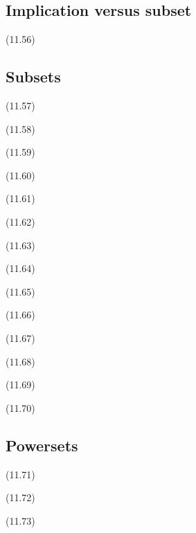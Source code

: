 \documentclass[a4paper,10pt]{article}
\newenvironment{theoremlist}{
\begin{description}
  \setlength{\itemsep}{1.5pt}
  \setlength{\parskip}{0pt}
  \setlength{\parsep}{0pt}
}{\end{description}}
\begin{document}
\subsection{Implication versus subset}
\begin{theoremlist}
\item[(11.56)]									$  $
\end{theoremlist}

\subsection{Subsets}
\begin{theoremlist}
\item[(11.57)]									$  $
\item[(11.58)]									$  $
\item[(11.59)]									$  $
\item[(11.60)]									$  $
\item[(11.61)]									$  $
\item[(11.62)]									$  $
\item[(11.63)]									$  $
\item[(11.64)]									$  $
\item[(11.65)]									$  $
\item[(11.66)]									$  $
\item[(11.67)]									$  $
\item[(11.68)]									$  $
\item[(11.69)]									$  $
\item[(11.70)]									$  $
\end{theoremlist}

\subsection{Powersets}
\begin{theoremlist}
\item[(11.71)]									$  $
\item[(11.72)]									$  $
\item[(11.73)]									$  $
\end{theoremlist}
\end{document}
